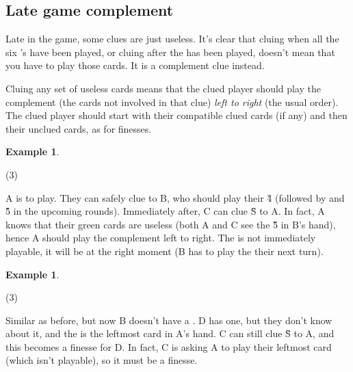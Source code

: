 \documentclass[a4paper]{article}
\theoremstyle{plain}
\theoremstyle{definition}
\newtheorem{example}[theorem]{Example}
\begin{document}
\subsection{Late game complement}

Late in the game, some clues are just useless. It's clear that cluing  when all the six 's have been played, or cluing  after the  has been played, doesn't mean that you have to play those cards. It is a complement clue instead.

Cluing any set of useless cards means that the clued player should play the complement (the cards not involved in that clue) \textit{left to right} (the usual order). The clued player should start with their compatible clued cards (if any) and then their unclued cards, as for finesses.

\begin{example}
	\hfill
	\begin{tasks}(3)
		\task[+]      
		\task[A]    
		\task[B]    
		\task[C]    
		\task[D]    
		\task[E]    
	\end{tasks}
	
	A is to play. They can safely clue  to B, who should play their \G{4} (followed by  and \G{5} in the upcoming rounds). Immediately after, C can clue \G{S} to A. In fact, A knows that their green cards are useless (both A and C see the \G{5} in B's hand), hence A should play the complement left to right. The  is not immediately playable, it will be at the right moment (B has to play the  their next turn).
\end{example}

\begin{example}
	\hfill
	\begin{tasks}(3)
		\task[+]      
		\task[A]    
		\task[B]    
		\task[C]    
		\task[D]    
		\task[E]    
	\end{tasks}
	
	Similar as before, but now B doesn't have a . D has one, but they don't know about it, and the  is the leftmost card in A's hand. C can still clue \G{S} to A, and this becomes a finesse for D. In fact, C is asking A to play their leftmost card (which isn't playable), so it must be a finesse.
\end{example}
\end{document}
